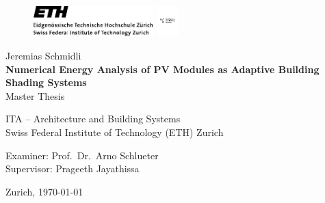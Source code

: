 \begin{titlepage}
\begin{center}

\begin{figure}[!ht]
\includegraphics[height=12mm]{figures/ethlogo}
\hfill
\includegraphics[height=12mm]{figures/ASlogo}
\end{figure}

\vspace{30mm} Jeremias Schmidli \\
\vspace{10mm} \textbf{\LARGE Numerical Energy Analysis of PV Modules as Adaptive Building Shading Systems} \\
\vspace{10mm} Master Thesis \\ 

\vfill

ITA -- Architecture and Building Systems \\ Swiss Federal Institute of Technology (ETH) Zurich \\

\vspace{5mm}

Examiner: Prof.~Dr.~Arno Schlueter \\
Supervisor: Prageeth Jayathissa

\vspace{5mm} Zurich, \today

\end{center}
\end{titlepage}
